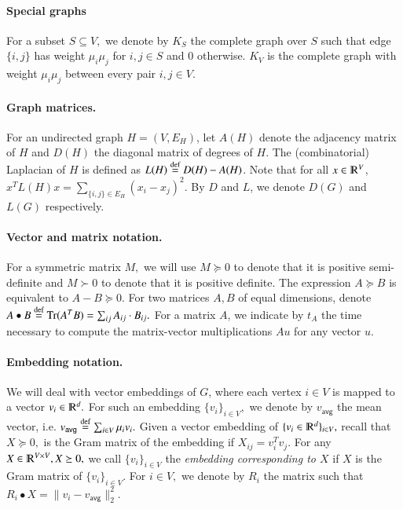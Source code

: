 \documentclass[twoside,leqno,twocolumn]{article}
\renewcommand{\mathbb}{\varmathbb}
\newcommand{\norm}[1]{\lVert#1\rVert}
\newcommand{\defeq}{\stackrel{\textup{def}}{=}}
\newcommand{\R}{\mathbb R}
\newcommand{\Tr}{{\rm Tr}}
\numberwithin{equation}{section}
\newcommand{\avg}{{\ensuremath{\mathsf{avg}}\xspace}}
\begin{document}
\paragraph{Special graphs}
For a subset $S \subseteq V,$ we denote by $K_S$ the complete graph over $S$ such that edge $\{i,j\}$ has weight $\mu_i \mu_j$ for $i,j \in S$ and $0$ otherwise. $K_V$ is the complete graph with weight $\mu_i \mu_j$ between every pair $i,j \in V.$




\paragraph{Graph matrices.} For an undirected graph $H=(V, E_H)$, let
$A(H)$ denote the adjacency matrix of $H$ and $D(H)$ the diagonal matrix of
degrees of $H$.
The (combinatorial) Laplacian of $H$ is defined as $L(H) \defeq D(H) - A(H)$.
Note that for all $x \in \R^{V}$, $x^T L(H) x = \sum_{\{i,j\} \in E_H} (x_i - x_j)^2$.
By $D$ and $L$, we denote $ D(G)$ and $L(G)$ respectively.




\paragraph*{Vector and matrix notation.}

For a symmetric matrix $M,$ we will use $M \succeq 0$ to denote that it is positive semi-definite and $M \succ 0$ to denote that it is positive definite.
The expression $A \succeq B$ is equivalent to $A - B \succeq 0$. For two matrices $A,B$ of equal dimensions, denote $A \bullet B \defeq \Tr(A^T B) = \sum_{ij} A_{ij}\cdot B_{ij}.$ 
For a matrix $A$, we indicate by $t_A$ the time necessary to compute the matrix-vector multiplications $Au$ for any vector $u$. 



\paragraph{Embedding notation.} We will deal with vector embeddings of $G$, where each vertex $i \in V$ is mapped to a vector $v_i \in \R^d.$ For such an embedding $\{v_i\}_{i \in V},$ we denote by $v_\avg$ the mean vector, i.e. $v_\avg \defeq \sum_{i \in V} \mu_i v_i.$
Given a vector embedding of $\{v_i \in \R^d\}_{i \in V},$ recall that $X \succeq 0,$ is the Gram matrix of the embedding if $X_{ij} = v_i^T v_j.$ For any $X \in \R^{V \times V}, X\succeq 0,$ we call $\{v_i\}_{i \in V}$ the {\it embedding corresponding to $X$} if $X$ is the Gram matrix of $\{v_i\}_{i \in V}.$ 
For $i \in V,$ we denote by $R_i$ the matrix such that $R_i \bullet X = \norm{v_i - v_\avg}_2^2.$
\end{document}
